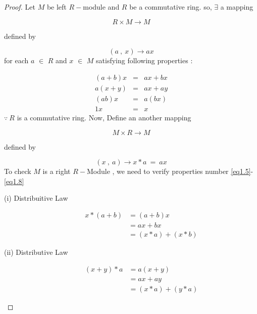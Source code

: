 \begin{proof}
 Let $M$ be left $R-$module and $R$ be a commutative ring. \newline
	so, $\exists$ a mapping

\begin{equation*}
R \times M \rightarrow M
\end{equation*}
	
defined by

\begin{equation*}
(a \ , \ x) \rightarrow ax

\end{equation*}
for each $a$ $\in$ $R$ and $x$ $\in$ $M$ satisfying following properties :

\begin{eqnarray*}
(a+b) x &=& ax + bx \\ a(x+y) &=& ax + ay \\ (ab)x &=& a(bx) \\ 1x &=& x

\end{eqnarray*}
$\because \ R$ is a commutative ring.\newline
Now, Define an another mapping

\begin{equation*}
 M \times R \rightarrow M
 \end{equation*}
	
 defined by

\begin{equation*}
 (x \ ,\ a) \rightarrow x*a \ = \ ax
 
\end{equation*}
To check $M$ is a right $R-$Module , we need to verify properties number \ref{eq1.5}-\eqref{eq1.8}

\begin{description}
 	\item[(i) Distribuitive Law]

\begin{align*}
 		x*(a+b) &= (a+b)x \\ &= ax + bx \\ &= (x*a) + (x*b)
 	
\end{align*}
 	\item[(ii) Distributive Law]

\begin{align*}
 		(x+y)*a &= a(x+y) \\ &= ax + ay \\ &= (x*a) + (y*a)
 	      

\end{align*}
\end{description}
\end{proof}
